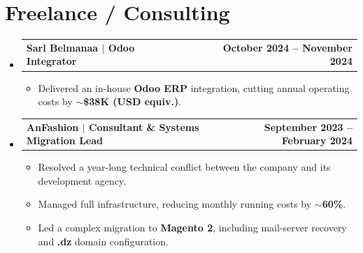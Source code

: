 \documentclass[letterpaper,11pt]{article}
\makeatletter
\newcommand{\resumeItem}[1]{
  \item\small{
    {#1 \vspace{-2pt}}
  }
}
\newcommand{\resumeProjectHeading}[2]{
  \vspace{-2pt}\item
    \begin{tabular*}{1.0\textwidth}[t]{l@{\extracolsep{\fill}}r}
      \textbf{#1} & \textbf{\small #2} \\
    \end{tabular*}\vspace{-2pt}
}
\newcommand{\resumeSubHeadingListStart}{\begin{itemize}[leftmargin=0.0in, label={}]}
\newcommand{\resumeSubHeadingListEnd}{\end{itemize}}
\newcommand{\resumeItemListStart}{\begin{itemize}}
\newcommand{\resumeItemListEnd}{\end{itemize}\vspace{0pt}}
\makeatother
\begin{document}
\section{Freelance / Consulting}
\resumeSubHeadingListStart

\resumeProjectHeading
{\textbf{Sarl Belmanaa} $|$ Odoo Integrator}{October 2024 -- November 2024}
\resumeItemListStart
\resumeItem{Delivered an in-house \textbf{Odoo ERP} integration, cutting annual operating costs by \textbf{$\sim$\$38K (USD equiv.)}.}
\resumeItemListEnd

\resumeProjectHeading
{\textbf{AnFashion} $|$ Consultant \& Systems Migration Lead}{September 2023 -- February 2024}
\resumeItemListStart
\resumeItem{Resolved a year-long technical conflict between the company and its development agency.}
\resumeItem{Managed full infrastructure, reducing monthly running costs by \textbf{$\sim$60\%}.}
\resumeItem{Led a complex migration to \textbf{Magento 2}, including mail-server recovery and \textbf{.dz} domain configuration.}
\resumeItemListEnd

\resumeSubHeadingListEnd
\end{document}
